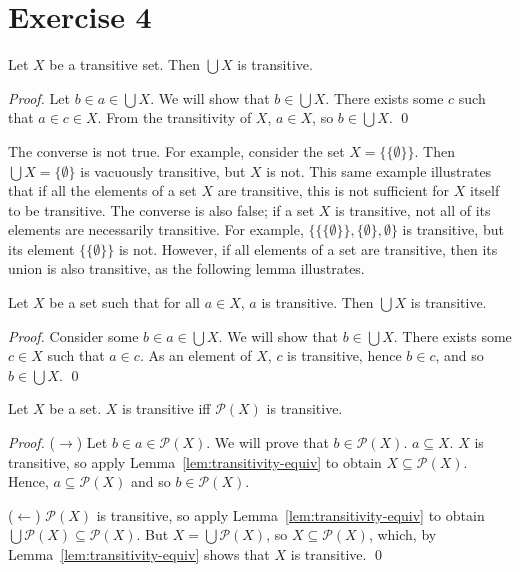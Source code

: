 \documentclass[11pt]{llncs}
\begin{document}
\section*{Exercise 4}
\begin{lemma}
  Let $X$ be a transitive set. Then $\bigcup X$ is transitive.
\end{lemma}
\begin{proof}
  Let $b \in a \in \bigcup X$. We will show that $b \in \bigcup X$.
  There exists some $c$ such that $a \in c \in X$. From the transitivity of $X$,
  $a \in X$, so $b \in \bigcup X$.
  \qed
\end{proof}

The converse is not true. For example, consider the set
$X = \{\{\emptyset\}\}$. Then $\bigcup X = \{\emptyset\}$ is vacuously
transitive, but $X$ is not. This same example illustrates that if all the
elements of a set $X$ are transitive, this is not sufficient for $X$ itself
to be transitive. The converse is also false; if a set $X$ is transitive, not
all of its elements are necessarily transitive. For example,
$\{\{\{\emptyset\}\}, \{\emptyset\}, \emptyset\}$ is transitive, but
its element $\{\{\emptyset\}\}$ is not. However, if all elements of a set are
transitive, then its union is also transitive, as the following lemma
illustrates.

\begin{lemma}
  Let $X$ be a set such that for all $a \in X$, $a$ is transitive.
  Then $\bigcup X$ is transitive.
\end{lemma}
\begin{proof}
  Consider some $b \in a \in \bigcup X$. We will show that $b \in \bigcup X$.
  There exists some $c \in X$ such that $a \in c$. As an element of $X$, $c$ is
  transitive, hence $b \in c$, and so $b \in \bigcup X$.
  \qed
\end{proof}

\begin{lemma}
  Let $X$ be a set. $X$ is transitive iff $\mathcal{P}(X)$ is transitive.
\end{lemma}
\begin{proof}
  \item{($\rightarrow$)}
  Let $b \in a \in \mathcal{P}(X)$. We will prove that $b \in \mathcal{P}(X)$.
  $a \subseteq X$. $X$ is transitive, so apply
  Lemma~\ref{lem:transitivity-equiv} to obtain
  $X \subseteq \mathcal{P}(X)$. Hence, $a \subseteq \mathcal{P}(X)$ and so
  $b \in \mathcal{P}(X)$.

  \item{($\leftarrow$)}
  $\mathcal{P}(X)$ is transitive, so apply Lemma~\ref{lem:transitivity-equiv}
  to obtain $\bigcup\mathcal{P}(X) \subseteq \mathcal{P}(X)$.
  But $X = \bigcup\mathcal{P}(X)$, so $X \subseteq \mathcal{P}(X)$, which,
  by Lemma~\ref{lem:transitivity-equiv} shows that $X$ is transitive.
  \qed
\end{proof}
\end{document}
